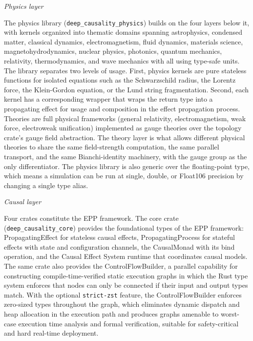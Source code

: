 \textit{Physics layer} 

The physics library (\texttt{deep\_causality\_physics}) builds on the four layers below it, with kernels organized into thematic domains spanning astrophysics, condensed matter, classical dynamics, electromagnetism, fluid dynamics, materials science, magnetohydrodynamics, nuclear physics, photonics, quantum mechanics, relativity, thermodynamics, and wave mechanics with all using type-safe units. The library separates two levels of usage. First, physics kernels are pure stateless functions for isolated equations such as the Schwarzschild radius, the Lorentz force, the Klein-Gordon equation, or the Lund string fragmentation. Second, each kernel has a corresponding wrapper that wraps the return type into a propagating effect for usage and composition in the effect propagation process. Theories are full physical frameworks (general relativity, electromagnetism, weak force, electroweak unification) implemented as gauge theories over the topology crate's gauge field abstraction. The theory layer is what allows different physical theories to share the same field-strength computation, the same parallel transport, and the same Bianchi-identity machinery, with the gauge group as the only differentiator. The physics library is also generic over the floating-point type, which means a simulation can be run at single, double, or Float106 precision by changing a single type alias.
 
\textit{Causal layer} 

Four crates constitute the EPP framework. The core crate (\texttt{deep\_causality\_core}) provides the foundational types of the EPP framework: PropagatingEffect for stateless causal effects, PropagatingProcess for stateful effects with state and configuration channels, the CausalMonad with its bind operation, and the Causal Effect System runtime that coordinates causal models. The same crate also provides the ControlFlowBuilder, a parallel capability for constructing compile-time-verified static execution graphs in which the Rust type system enforces that nodes can only be connected if their input and output types match. With the optional \texttt{strict-zst} feature, the ControlFlowBuilder enforces zero-sized types throughout the graph, which eliminates dynamic dispatch and heap allocation in the execution path and produces graphs amenable to worst-case execution time analysis and formal verification, suitable for safety-critical and hard real-time deployment. 


